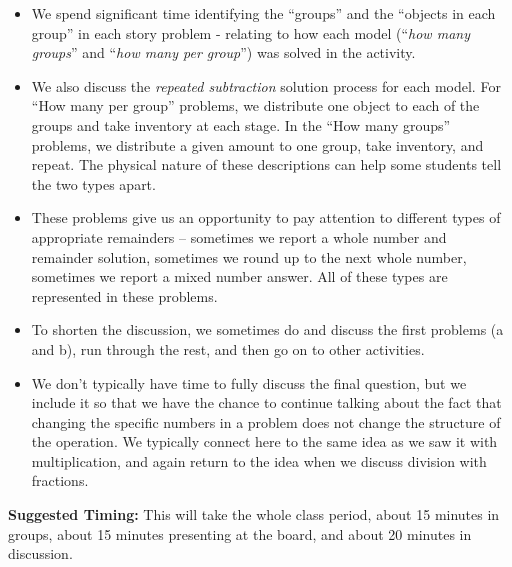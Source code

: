 \documentclass[nooutcomes]{ximera}
\begin{document}
\begin{instructorNotes}
\begin{itemize}
	\item We spend significant time identifying the ``groups'' and the ``objects in each group'' in each story problem - relating to how each model (``{\em how many groups}'' and ``{\em how many per group}'') was solved in the activity.
	\item We also discuss the {\em repeated subtraction} solution process for each model.  For ``How many per group'' problems, we distribute one object to each of the groups and take inventory at each stage.  In the ``How many groups'' problems, we distribute a given amount to one group, take inventory, and repeat.  The physical nature of these descriptions can help some students tell the two types apart.  %
	\item These problems give us an opportunity to pay attention to different types of appropriate remainders -- sometimes we report a whole number and remainder solution, sometimes we round up to the next whole number, sometimes we report a mixed number answer.  All of these types are represented in these problems. 
    \item To shorten the discussion, we sometimes do and discuss the first problems (a and b), run through the rest, and then go on to other activities.
    \item We don't typically have time to fully discuss the final question, but we include it so that we have the chance to continue talking about the fact that changing the specific numbers in a problem does not change the structure of the operation.  We typically connect here to the same idea as we saw it with multiplication, and again return to the idea when we discuss division with fractions.
\end{itemize}



{\bf Suggested Timing:} This will take the whole class period, about 15 minutes in groups, about 15 minutes presenting at the board, and about 20 minutes in discussion.
\end{instructorNotes}
\end{document}
